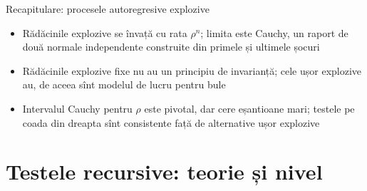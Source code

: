 \begin{frame}{Recapitulare: procesele autoregresive explozive}
\itemsize{\small}
\begin{itemize}
    \item Rădăcinile explozive se învață cu rata $\rho^n$; limita este Cauchy, un raport de două normale independente construite din primele și ultimele șocuri
    \item Rădăcinile explozive fixe nu au un principiu de invarianță; cele ușor explozive au, de aceea sînt modelul de lucru pentru bule
    \item Intervalul Cauchy pentru $\rho$ este pivotal, dar cere eșantioane mari; testele pe coada din dreapta sînt consistente față de alternative ușor explozive
\end{itemize}
\end{frame}


\section{Testele recursive: teorie și nivel}

